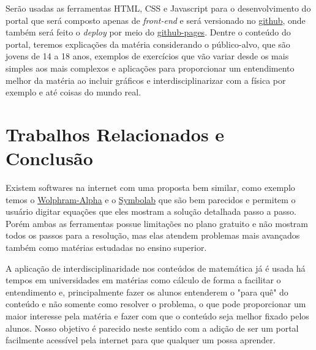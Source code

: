 \documentclass[12pt]{article}
\begin{document}
  Serão usadas as ferramentas HTML, CSS e Javascript para o desenvolvimento do portal que será composto apenas de \textit{front-end} e será versionado no \href{https://github.com/Pedenite/PILC-eq}{github}, onde também será feito o \textit{deploy} por meio do \href{https://pedenite.github.io/PILC-eq/}{github-pages}. Dentre o conteúdo do portal, teremos explicações da matéria considerando o público-alvo, que são jovens de 14 a 18 anos, exemplos de exercícios que vão variar desde os mais simples aos mais complexos e aplicações para proporcionar um entendimento melhor da matéria ao incluir gráficos e interdisciplinarizar com a física por exemplo e até coisas do mundo real.

\section{Trabalhos Relacionados e Conclusão}
  Existem softwares na internet com uma proposta bem similar, como exemplo temos o \href{http://www.wolframalpha.com/}{Wolphram-Alpha} e o \href{https://pt.symbolab.com/}{Symbolab} que são bem parecidos e permitem o usuário digitar equações que eles mostram a solução detalhada passo a passo. Porém ambas as ferramentas possue limitações no plano gratuito e não mostram todos os passos para a resolução, mas elas atendem problemas mais avançados também como matérias estudadas no ensino superior.

  A aplicação de interdisciplinaridade nos conteúdos de matemática já é usada há tempos em universidades em matérias como cálculo de forma a facilitar o entendimento e, principalmente fazer os alunos entenderem o "para quê" do conteúdo e não somente como resolver o problema, o que pode proporcionar um maior interesse pela matéria e fazer com que o conteúdo seja melhor fixado pelos alunos. Nosso objetivo é parecido neste sentido com a adição de ser um portal facilmente acessível pela internet para que qualquer um possa aprender.
\end{document}
